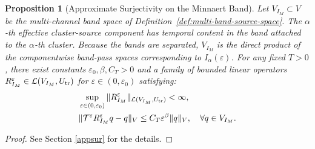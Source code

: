 \documentclass[11pt,a4paper]{article}
\numberwithin{equation}{section}
\newtheorem{proposition}[theorem]{Proposition}
\begin{document}
\begin{proposition}[Approximate Surjectivity on the Minnaert Band]
\label{prop:surjectivity-IM-statement}
Let $V_{I_M} \subset V$ be the multi-channel band space of Definition~\ref{def:multi-band-source-space}. The $\alpha$-th effective cluster-source component has temporal content in the band attached to the $\alpha$-th cluster. Because the bands are separated, $V_{I_M}$ is the direct product of the componentwise band-pass spaces corresponding to $I_\alpha(\varepsilon)$. For any fixed $T>0$, there exist constants $\varepsilon_0, \beta, C_T > 0$ and a family of bounded linear operators $R_{I_M}^\varepsilon \in \mathcal{L}(V_{I_M}, U_{\rm tr})$ for $\varepsilon \in (0, \varepsilon_0)$ satisfying:
\begin{align}
    &\sup_{\varepsilon \in (0, \varepsilon_0)} \|R_{I_M}^\varepsilon\|_{\mathcal{L}(V_{I_M}, U_{\rm tr})} < \infty, \label{eq:uniform-bound-IM} \\
    &\| \mathcal{T}^\varepsilon R_{I_M}^\varepsilon q - q \|_{V} \le C_T \varepsilon^\beta \| q \|_V, \quad \forall q \in V_{I_M}. \label{eq:approx-right-inverse-IM}
\end{align}
\end{proposition}
\begin{proof}
    See Section \ref{appsur} for the details.
\end{proof}
\end{document}
